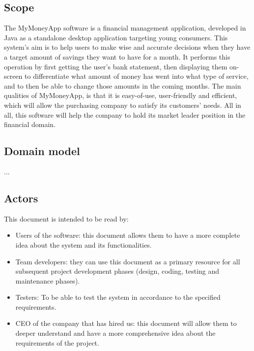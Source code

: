\documentclass[letterpaper]{article}
\begin{document}
	\subsection{Scope}
	
		The MyMoneyApp software is a financial management application, developed in Java as a standalone desktop application targeting young consumers. This system’s aim is to help users to make wise and accurate decisions when they have a target amount of savings they want to have for a month. It performs this operation by first getting the user’s bank statement, then displaying them on-screen to differentiate what amount of money has went into what type of service, and to then be able to change those amounts in the coming months. The main qualities of MyMoneyApp, is that it is easy-of-use, user-friendly and efficient, which will allow the purchasing company to satisfy its customers’ needs. All in all, this software will help the company to hold its market leader position in the financial domain.
	
	\subsection{Domain model}
	
		...
	
	\subsection{Actors}
	
		This document is intended to be read by:
		
		\begin{itemize}
			
			\item Users of the software: this document allows them to have a more complete idea about the system and its functionalities.
			
			\item Team developers: they can use this document as a primary resource for all subsequent project development phases (design, coding, testing and maintenance phases).
			
			\item Testers: To be able to test the system in accordance to the specified requirements.
			
			\item CEO of the company that has hired us: this document will allow them to deeper understand and have a more comprehensive idea about the requirements of the project.
			
		\end{itemize}
\end{document}
